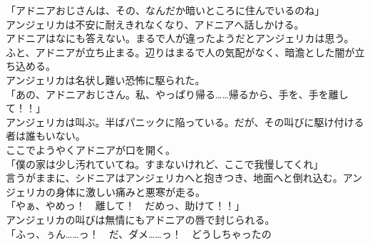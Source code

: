 \documentclass[b5j,10pt,openany]{jsbook}
\begin{document}
「アドニアおじさんは、その、なんだか暗いところに住んでいるのね」\\アンジェリカは不安に耐えきれなくなり、アドニアへ話しかける。\\アドニアはなにも答えない。まるで人が違ったようだとアンジェリカは思う。\\ふと、アドニアが立ち止まる。辺りはまるで人の気配がなく、暗澹とした闇が立ち込める。\\アンジェリカは名状し難い恐怖に駆られた。\\「あの、アドニアおじさん。私、やっぱり帰る\ldots{}\ldots{}帰るから、手を、手を離して！！」\\アンジェリカは叫ぶ。半ばパニックに陥っている。だが、その叫びに駆け付ける者は誰もいない。\\ここでようやくアドニアが口を開く。\\「僕の家は少し汚れていてね。すまないけれど、ここで我慢してくれ」\\言うがままに、シドニアはアンジェリカへと抱きつき、地面へと倒れ込む。アンジェリカの身体に激しい痛みと悪寒が走る。\\「やぁ、やめっ！　離して！　だめっ、助けて！！」\\アンジェリカの叫びは無情にもアドニアの唇で封じられる。\\「ふっ、ぅん\ldots{}\ldots{}っ！　だ、ダメ\ldots{}\ldots{}っ！　どうしちゃったの
\end{document}
